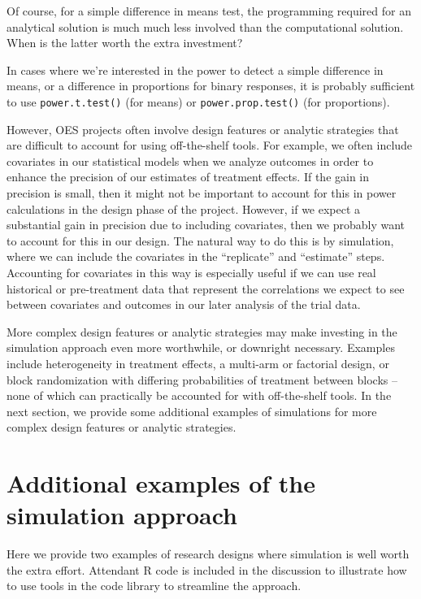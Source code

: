 \documentclass[
  12pt,
]{book}
\theoremstyle{definition}
\theoremstyle{definition}
\theoremstyle{definition}
\theoremstyle{remark}
\begin{document}
Of course, for a simple difference in means test, the programming
required for an analytical solution is much much less involved than the
computational solution. When is the latter worth the extra investment?

In cases where we're interested in the power to detect a simple
difference in means, or a difference in proportions for binary
responses, it is probably sufficient to use \texttt{power.t.test()} (for
means) or \texttt{power.prop.test()} (for proportions).

However, OES projects often involve design features or analytic
strategies that are difficult to account for using off-the-shelf tools.
For example, we often include covariates in our statistical models when
we analyze outcomes in order to enhance the precision of our estimates
of treatment effects. If the gain in precision is small, then it might
not be important to account for this in power calculations in the design
phase of the project. However, if we expect a substantial gain in
precision due to including covariates, then we probably want to account
for this in our design. The natural way to do this is by simulation,
where we can include the covariates in the ``replicate'' and
``estimate'' steps. Accounting for covariates in this way is especially
useful if we can use real historical or pre-treatment data that
represent the correlations we expect to see between covariates and
outcomes in our later analysis of the trial data.

More complex design features or analytic strategies may make investing
in the simulation approach even more worthwhile, or downright necessary.
Examples include heterogeneity in treatment effects, a multi-arm or
factorial design, or block randomization with differing probabilities of
treatment between blocks -- none of which can practically be accounted
for with off-the-shelf tools. In the next section, we provide some
additional examples of simulations for more complex design features or
analytic strategies.

\hypertarget{additional-examples-of-the-simulation-approach}{%
\section{Additional examples of the simulation
approach}\label{additional-examples-of-the-simulation-approach}}

Here we provide two examples of research designs where simulation is
well worth the extra effort. Attendant R code is included in the
discussion to illustrate how to use tools in the code library to
streamline the approach.
\end{document}
